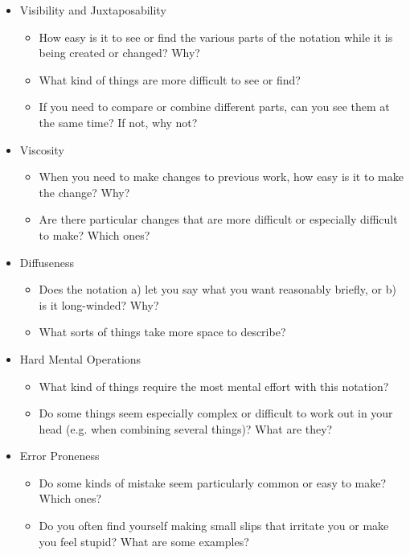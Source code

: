 \begin{itemize}
    \item Visibility and Juxtaposability
        \begin{itemize}
        \item How easy is it to see or find the various parts of the notation while it is being created or changed? Why?
        \item What kind of things are more difficult to see or find?
        \item If you need to compare or combine different parts, can you see them at the same time? If not, why not?
        \end{itemize}
    \item Viscosity
        \begin{itemize}
        \item When you need to make changes to previous work, how easy is it to make the change? Why?
        \item Are there particular changes that are more difficult or especially difficult to make? Which ones?
        \end{itemize}
    \item Diffuseness
        \begin{itemize}
        \item Does the notation a) let you say what you want reasonably briefly, or b) is it long-winded? Why?
        \item What sorts of things take more space to describe?
        \end{itemize}
    \item Hard Mental Operations
        \begin{itemize}
        \item What kind of things require the most mental effort with this notation?
        \item Do some things seem especially complex or difficult to work out in your head (e.g. when combining several things)? What are they?
        \end{itemize}
    \item Error Proneness
        \begin{itemize}
        \item Do some kinds of mistake seem particularly common or easy to make? Which ones?
        \item Do you often find yourself making small slips that irritate you or make you feel stupid? What are some examples?
        \end{itemize}

\end{itemize}
